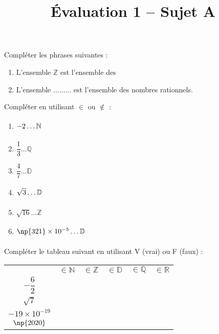 \documentclass[a4paper,dvipsnames]{article}
\begin{document}
\title{Évaluation 1 -- Sujet A}

\maketitle{}

\pagestyle{empty}

\exo[2 points] 
Compléter les phrases suivantes :
\begin{enumerate}
  \item L'ensemble $\mathbb{Z}$ est l'ensemble des \dotfill
  \item L'ensemble $\hdots\hdots\hdots$ est l'ensemble des nombres rationnels.
\end{enumerate}

\bigskip

\exo[3 points]
Compléter en utilisant $\in$ ou $\notin$ :
\begin{multicols}{3}
  \begin{enumerate}
    \item $-2\hdots\mathbb{N}\vphantom{\dfrac{1}{3}}$
    \item $\dfrac{1}{3}\hdots\mathbb{Q}$
    \item $\dfrac{4}{7}\hdots\mathbb{D}$
    \item $\sqrt{3}\hdots\mathbb{D}\vphantom{\dfrac{1}{3}}$
    \item $\sqrt{16}\hdots\mathbb{Z}$
    \item $\np{321}\times10^{-5}\hdots\mathbb{D}\vphantom{\dfrac{1}{3}}$
  \end{enumerate}
\end{multicols}

\bigskip

\exo[2 points]
Compléter le tableau suivant en utilisant V (vrai) ou F (faux) :
\begin{center}
  \begin{tabular}{@{}cccccc@{}}
    \toprule
    & $\in\mathbb{N}$ & $\in\mathbb{Z}$ & $\in\mathbb{D}$ & $\in\mathbb{Q}$ & $\in\mathbb{R}$\\
    \cmidrule(lr){2-6}
    $-\dfrac{6}{2}$ & & & & & \\ 
    \addlinespace[2mm]
    $\sqrt{7}$ & & & & & \\
    \addlinespace[1mm]
    $-19\times10^{-19}$ & & & & & \\
    \addlinespace[1mm]
    $\np{2020}$ & & & & & \\
    \bottomrule
  \end{tabular}
\end{center}
\end{document}
